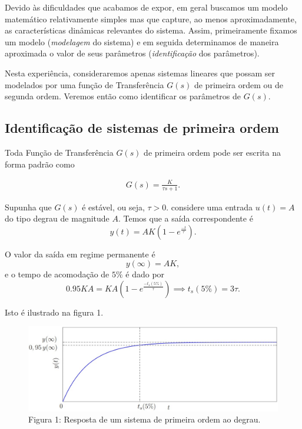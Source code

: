 \documentclass[
]{book}
\begin{document}
Devido às dificuldades que acabamos de expor, em geral buscamos um modelo matemático relativamente simples mas que capture, ao menos aproximadamente, as características dinâmicas relevantes do sistema. Assim, primeiramente fixamos um modelo (\emph{modelagem} do sistema) e em seguida determinamos de maneira aproximada o valor de seus parâmetros (\emph{identificação} dos parâmetros).

Nesta experiência, consideraremos apenas sistemas lineares que possam ser modelados por uma função de Transferência \(G(s)\) de primeira ordem ou de segunda ordem. Veremos então como identificar os parâmetros de \(G(s)\).

\hypertarget{identificauxe7uxe3o-de-sistemas-de-primeira-ordem}{%
\subsection*{Identificação de sistemas de primeira ordem}\label{identificauxe7uxe3o-de-sistemas-de-primeira-ordem}}

Toda Função de Transferência \(G(s)\) de primeira ordem pode ser escrita na forma padrão como

\begin{align}
G(s) = \frac{K}{\tau s+1}. \label{eq:eq31}
\end{align}

Supunha que \(G(s)\) é estável, ou seja, \(\tau > 0\). considere uma entrada \(u(t) = A\) do tipo degrau de magnitude \(A\). Temos que a saída correspondente é
\[
y(t) = AK(1- e^{\frac {-t}{\tau}}).
\]

O valor da saída em regime permanente é
\[
y(\infty) = AK,
\]
e o tempo de acomodação de \(5\%\) é dado por
\[
0.95KA = KA(1- e^{\frac {-t_s(5\%)}{\tau}}) \implies t_s(5\%) =3 \tau.
\]

Isto é ilustrado na figura 1.

\begin{figure}
\centering
\includegraphics{Imagens/Lab3/Explicação/fig1.jpg}
\caption{Figura 1: Resposta de um sistema de primeira ordem ao degrau.}
\end{figure}
\end{document}
